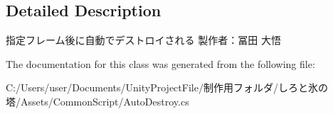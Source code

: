 \subsection{Detailed Description}
指定フレーム後に自動でデストロイされる 製作者：冨田 大悟 



The documentation for this class was generated from the following file\+:\begin{DoxyCompactItemize}
\item 
C\+:/\+Users/user/\+Documents/\+Unity\+Project\+File/制作用フォルダ/しろと氷の塔/\+Assets/\+Common\+Script/Auto\+Destroy.\+cs\end{DoxyCompactItemize}
